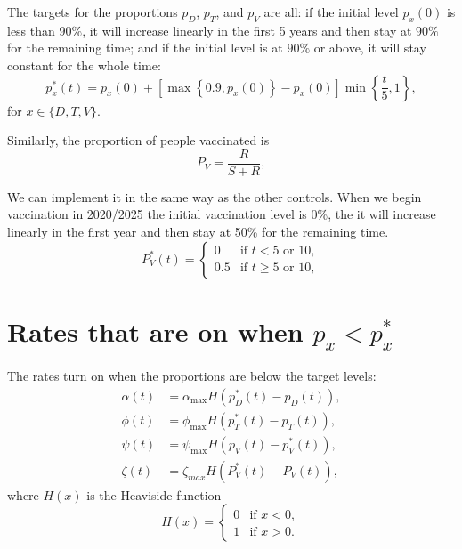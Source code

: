 \documentclass{article}
\begin{document}
The targets for the proportions $p_D$, $p_T$, and $p_V$ are all:
if the initial level $p_x(0)$ is less than $90\%$, it will increase
linearly in the first 5 years and then stay at $90\%$ for the
remaining time; and if the initial level is at $90\%$ or above, it
will stay constant for the whole time:
\begin{equation}
  p_x^*(t)
  = p_x(0) + \left[
    \max\left\{0.9, p_x(0)\right\} - p_x(0)
  \right]
  \min\left\{\frac{t}{5}, 1\right\},
\end{equation}
for $x \in \{D, T, V\}$.


Similarly, the proportion of people vaccinated is
\begin{equation}
P_{V} = \frac{R}{S+R},
\end{equation}

We can implement it in the same way as the other controls. When we begin
vaccination in 2020/2025 the initial vaccination level is 0\%, the it
will increase linearly in the first year and then stay at 50\% for the
remaining time.
\begin{equation}
P^{*}_{V}(t) =
  \begin{cases}
    0 & \text{if $t < 5$ or $10$},
    \\
    0.5  & \text{if $t \geq 5$ or $10$},
  \end{cases}
\end{equation}


\section{Rates that are on when $p_x < p^*_x$}

The rates turn on when the proportions are below the target levels:
\begin{equation}
  \begin{split}
    \alpha(t) &= \alpha_{\max} H\left(p_D^*(t) - p_D(t)\right),
    \\
    \phi(t) &= \phi_{\max} H\left(p_T^*(t) - p_T(t)\right),
    \\
    \psi(t) &= \psi_{\max} H\left(p_V(t) - p_V^*(t)\right),
    \\
    \zeta(t) &= \zeta_{max} H\left(P^{*}_{V}(t)-P_{V}(t)\right),
  \end{split}
\end{equation}
where $H(x)$ is the Heaviside function
\begin{equation}
  H(x) =
  \begin{cases}
    0 & \text{if $x < 0$},
    \\
    1 & \text{if $x > 0$}.
  \end{cases}
\end{equation}
\end{document}
